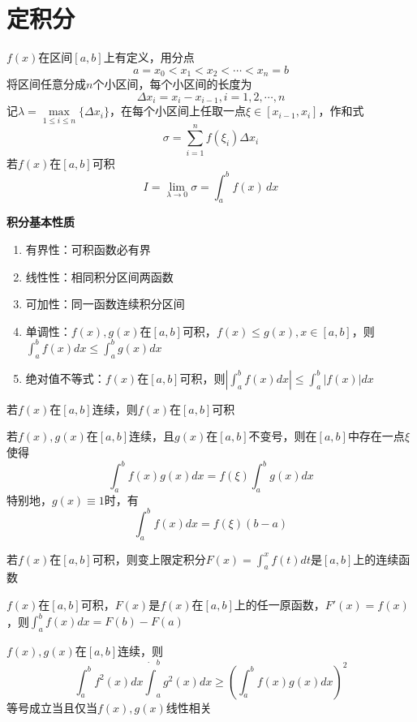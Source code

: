 \section{定积分}
\begin{definition}[Riemann积分]
$f(x)$在区间$[a,b]$上有定义，用分点
\[a=x_0<x_1<x_2<\cdots<x_n=b\]
将区间任意分成$n$个小区间，每个小区间的长度为
\[\Delta x_i=x_i-x_{i-1},i=1,2,\cdots,n\]
记$\lambda = \underset{1\leq i\leq n}{\max}\{\Delta x_i\}$，在每个小区间上任取一点$\xi\in[x_{i-1},x_i]$，作和式
\[\sigma = \sum_{i=1}^{n}f(\xi_i)\Delta x_i\]
若$f(x)$在$[a,b]$可积
\[I=\lim_{\lambda\to 0}\sigma=\int_a^bf(x)\,dx\]
\end{definition}
\par\textbf{积分基本性质}
\begin{enumerate}
	\item 有界性：可积函数必有界
	\item 线性性：相同积分区间两函数
	\item 可加性：同一函数连续积分区间
	\item 单调性：$f(x),g(x)$在$[a,b]$可积，$f(x)\leq g(x),x\in[a,b]$，则$\displaystyle\int_{a}^{b}f(x)dx\leq\int_{a}^{b}g(x)dx$
	\item 绝对值不等式：$f(x)$在$[a,b]$可积，则$\displaystyle\left|\int_{a}^{b}f(x)dx\right|\leq\int_{a}^{b}|f(x)|dx$
\end{enumerate}
\begin{theorem}[闭区间连续函数可积定理]
若$f(x)$在$[a,b]$连续，则$f(x)$在$[a,b]$可积
\end{theorem}
\begin{theorem}[积分第一中值定理]
若$f(x),g(x)$在$[a,b]$连续，且$g(x)$在$[a,b]$不变号，则在$[a,b]$中存在一点$\xi$使得
\[\int_a^bf(x)g(x)dx=f(\xi)\int_a^bg(x)dx\]
特别地，$g(x)\equiv 1$时，有
\[\int_a^bf(x)dx=f(\xi)(b-a)\]
\end{theorem}
\begin{theorem}
若$f(x)$在$[a,b]$可积，则变上限定积分$\displaystyle F(x)=\int_a^x f(t)dt$是$[a,b]$上的连续函数
\end{theorem}
\begin{theorem}[微积分基本定理]
$f(x)$在$[a,b]$可积，$F(x)$是$f(x)$在$[a,b]$上的任一原函数，$F'(x)=f(x)$，则$\displaystyle\int_{a}^{b}f(x)dx=F(b)-F(a)$
\end{theorem}
\begin{theorem}
$f(x),g(x)$在$[a,b]$连续，则
\[\int_a^bf^2(x)dx\dot \int_a^bg^2(x)dx\geq\left(\int_a^bf(x)g(x)dx\right)^2\]
等号成立当且仅当$f(x),g(x)$线性相关
\end{theorem}
